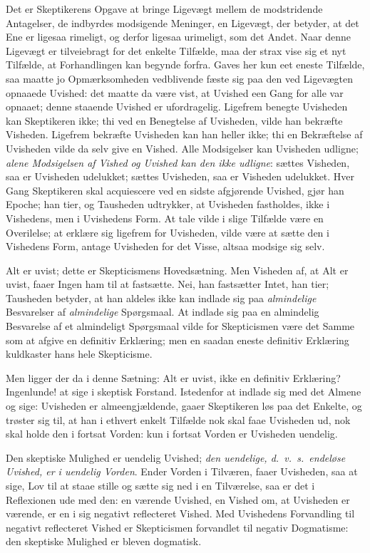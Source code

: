 \documentclass[12pt]{book}
\newcommand{\opage}[1]{\marginnote{\footnotesize\textit{[#1]}}}
\begin{document}
Det er Skeptikerens Opgave at bringe Ligevægt mellem de modstridende Antagelser, de indbyrdes modsigende Meninger, en Ligevægt, der betyder, at det Ene er ligesaa rimeligt, og derfor ligesaa urimeligt, som det Andet. Naar denne Ligevægt er tilveiebragt for det enkelte Tilfælde, maa der strax vise sig et nyt Tilfælde, at Forhandlingen kan begynde forfra. Gaves her kun eet eneste Tilfælde, saa maatte jo Opmærksomheden vedblivende fæste sig paa den ved Ligevægten opnaaede Uvished: det maatte da være vist, at Uvished een Gang for alle var opnaaet; denne staaende Uvished er ufordragelig. Ligefrem benegte Uvisheden kan Skeptikeren ikke; thi ved en Benegtelse af Uvisheden, vilde han bekræfte Visheden. Ligefrem bekræfte Uvisheden kan han heller ikke; thi en Bekræftelse af Uvisheden vilde da selv give en Vished. Alle Modsigelser kan Uvisheden udligne; \emph{alene Modsigelsen af Vished og Uvished kan den ikke udligne}: sættes Visheden, saa er Uvisheden udelukket; sættes Uvisheden, saa er Visheden udelukket. Hver Gang Skeptikeren skal acquiescere ved en sidste afgjørende Uvished, gjør han Epoche; han tier, og Tausheden udtrykker, at Uvisheden fastholdes, ikke i Vishedens, men i Uvishedens Form. At tale vilde i slige Tilfælde være en Overilelse; at
\opage{222}erklære sig ligefrem for Uvisheden, vilde være at sætte den i Vishedens Form, antage Uvisheden for det Visse, altsaa modsige sig selv.

Alt er uvist; dette er Skepticismens Hovedsætning. Men Visheden af, at Alt er uvist, faaer Ingen ham til at fastsætte. Nei, han fastsætter Intet, han tier; Tausheden betyder, at han aldeles ikke kan indlade sig paa \emph{almindelige} Besvarelser af \emph{almindelige} Spørgsmaal. At indlade sig paa en almindelig Besvarelse af et almindeligt Spørgsmaal vilde for Skepticismen være det Samme som at afgive en definitiv Erklæring; men en saadan eneste definitiv Erklæring kuldkaster hans hele Skepticisme.

Men ligger der da i denne Sætning: Alt er uvist, ikke en definitiv Erklæring? Ingenlunde! at sige i skeptisk Forstand. Istedenfor at indlade sig med det Almene og sige: Uvisheden er almeengjældende, gaaer Skeptikeren løs paa det Enkelte, og trøster sig til, at han i ethvert enkelt Tilfælde nok skal faae Uvisheden ud, nok skal holde den i fortsat Vorden: kun i fortsat Vorden er Uvisheden uendelig.

Den skeptiske Mulighed er uendelig Uvished; \emph{den uendelige, d.\ v.\ s.\ endeløse Uvished, er i uendelig Vorden}. Ender Vorden i Tilværen, faaer Uvisheden, saa at sige, Lov til at staae stille og sætte sig ned i en Tilværelse, saa er det i Reflexionen ude med den: en værende Uvished, en Vished om, at Uvisheden er værende, er en i sig negativt reflecteret Vished. Med Uvishedens Forvandling til negativt reflecteret Vished er Skepticismen forvandlet til negativ Dogmatisme: den skeptiske Mulighed er bleven dogmatisk.
\end{document}
